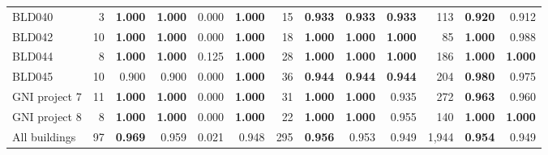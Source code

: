 \begin{table}[htbp]
\begin{tabular}{@{}lrrrrrrrrrrrr@{}}
BLD040 & 3 & \textbf{1.000} & \textbf{1.000} & 0.000 & \textbf{1.000} & 15 & \textbf{0.933} & \textbf{0.933} & \textbf{0.933} & 113 & \textbf{0.920} & 0.912 \\
BLD042 & 10 & \textbf{1.000} & \textbf{1.000} & 0.000 & \textbf{1.000} & 18 & \textbf{1.000} & \textbf{1.000} & \textbf{1.000} & 85 & \textbf{1.000} & 0.988 \\
BLD044 & 8 & \textbf{1.000} & \textbf{1.000} & 0.125 & \textbf{1.000} & 28 & \textbf{1.000} & \textbf{1.000} & \textbf{1.000} & 186 & \textbf{1.000} & \textbf{1.000} \\
BLD045 & 10 & 0.900 & 0.900 & 0.000 & \textbf{1.000} & 36 & \textbf{0.944} & \textbf{0.944} & \textbf{0.944} & 204 & \textbf{0.980} & 0.975 \\
GNI project 7 & 11 & \textbf{1.000} & \textbf{1.000} & 0.000 & \textbf{1.000} & 31 & \textbf{1.000} & \textbf{1.000} & 0.935 & 272 & \textbf{0.963} & 0.960 \\
GNI project 8 & 8 & \textbf{1.000} & \textbf{1.000} & 0.000 & \textbf{1.000} & 22 & \textbf{1.000} & \textbf{1.000} & 0.955 & 140 & \textbf{1.000} & \textbf{1.000} \\
\midrule
All buildings & 97 & \textbf{0.969} & 0.959 & 0.021 & 0.948 & 295 & \textbf{0.956} & 0.953 & 0.949 & 1,944 & \textbf{0.954} & 0.949 \\
\bottomrule
\end{tabular}
\end{table}
